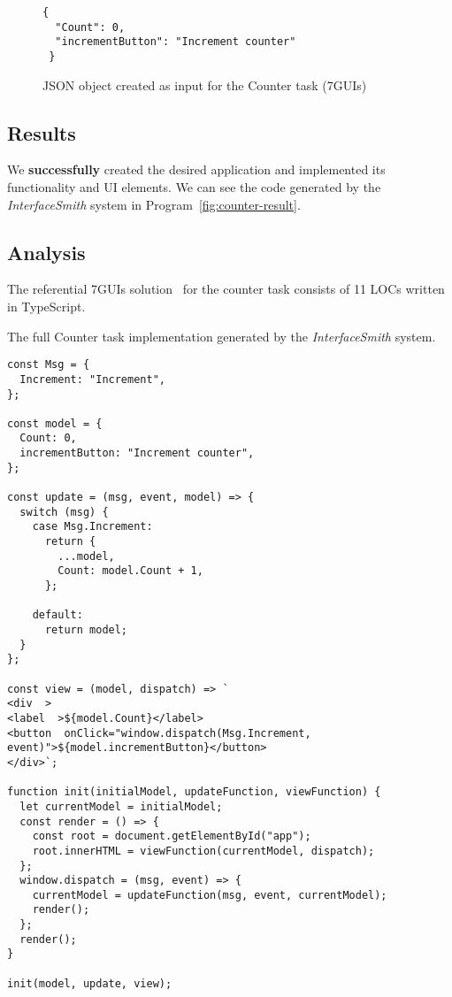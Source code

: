 \begin{figure}[htbp]
	\caption{JSON object created as input for the Counter task (7GUIs)}
	\label{fig:counter-json}
	\begin{lstlisting}
{
  "Count": 0,
  "incrementButton": "Increment counter"
 }
    \end{lstlisting}
\end{figure}
\medskip
\subsection{Results}
We \textbf{successfully} created the desired application and implemented its functionality and UI elements.
We can see the code generated by the \emph{InterfaceSmith} system in Program~\ref{fig:counter-result}.
\medskip
\subsection{Analysis}
The referential 7GUIs solution~\cite{7guis-React-TypeScript-MobX/src/app/guis/counter.tsx} for the counter task consists of 11 LOCs written in TypeScript.


\begin{listing}[p]
	\caption {The full Counter task implementation generated by the \emph{InterfaceSmith} system.}
	\label{fig:counter-result}
	\begin{lstlisting}
const Msg = {
  Increment: "Increment",
};

const model = {
  Count: 0,
  incrementButton: "Increment counter",
};

const update = (msg, event, model) => {
  switch (msg) {
    case Msg.Increment:
      return {
        ...model,
        Count: model.Count + 1,
      };

    default:
      return model;
  }
};

const view = (model, dispatch) => `
<div  >
<label  >${model.Count}</label>
<button  onClick="window.dispatch(Msg.Increment, event)">${model.incrementButton}</button>
</div>`;

function init(initialModel, updateFunction, viewFunction) {
  let currentModel = initialModel;
  const render = () => {
    const root = document.getElementById("app");
    root.innerHTML = viewFunction(currentModel, dispatch);
  };
  window.dispatch = (msg, event) => {
    currentModel = updateFunction(msg, event, currentModel);
    render();
  };
  render();
}

init(model, update, view);
\end{lstlisting}
\end{listing}


